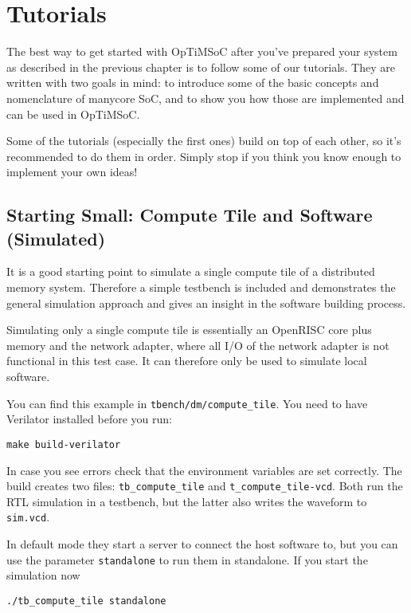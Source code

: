\chapter{Tutorials}
\label{chap:tutorials}

The best way to get started with OpTiMSoC after you've prepared your
system as described in the previous chapter is to follow some of our
tutorials. They are written with two goals in mind: to introduce some
of the basic concepts and nomenclature of manycore SoC, and to show
you how those are implemented and can be used in OpTiMSoC.

Some of the tutorials (especially the first ones) build on top of each
other, so it's recommended to do them in order. Simply stop if you
think you know enough to implement your own ideas!

\section{Starting Small: Compute Tile and Software (Simulated)}

It is a good starting point to simulate a single compute tile of a
distributed memory system. Therefore a simple testbench is included
and demonstrates the general simulation approach and gives an insight
in the software building process.

Simulating only a single compute tile is essentially an OpenRISC core
plus memory and the network adapter, where all I/O of the network
adapter is not functional in this test case. It can therefore only be
used to simulate local software.

You can find this example in \verb|tbench/dm/compute_tile|. You
need to have Verilator installed before you run:

\begin{lstlisting}
make build-verilator
\end{lstlisting}

In case you see errors check that the environment variables are set
correctly. The build creates two files: \verb|tb_compute_tile| and
\verb|t_compute_tile-vcd|. Both run the RTL simulation in a testbench,
but the latter also writes the waveform to \verb|sim.vcd|.

In default mode they start a server to connect the host software to,
but you can use the parameter \verb|standalone| to run them in
standalone. If you start the simulation now

\begin{lstlisting}
./tb_compute_tile standalone
\end{lstlisting}

